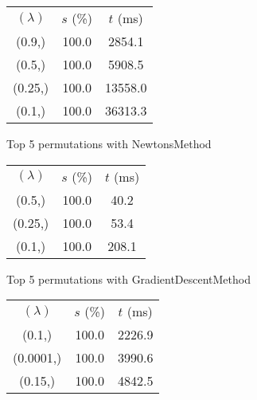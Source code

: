 \begin{figure}[H]
\label{fig:param_comp_NegativeEntropy_ConstantSearch}
\begin{subfigure}[ht]{.5\textwidth}
\begin{tabular}{|c|c|c|}
\hline
\rowcolor{gray!25}
\multicolumn{3}{|c|}{NewtonsMethod} \\
\hline
\rowcolor{gray!25}
$(\lambda)$ & $s$ (\%) & $t$ (ms) \\
\hline
(0.9,) & 100.0 & 2854.1 \\
(0.5,) & 100.0 & 5908.5 \\
(0.25,) & 100.0 & 13558.0 \\
(0.1,) & 100.0 & 36313.3 \\
\hline
\end{tabular}
\caption{Top 5 permutations with NewtonsMethod}
\label{subfig:param_comp_NegativeEntropy_NewtonsMethod_ConstantSearch}
\end{subfigure}
\hfill
\begin{subfigure}[ht]{.5\textwidth}
\begin{tabular}{|c|c|c|}
\hline
\rowcolor{gray!25}
\multicolumn{3}{|c|}{GradientDescentMethod} \\
\hline
\rowcolor{gray!25}
$(\lambda)$ & $s$ (\%) & $t$ (ms) \\
\hline
(0.5,) & 100.0 & 40.2 \\
(0.25,) & 100.0 & 53.4 \\
(0.1,) & 100.0 & 208.1 \\
\hline
\end{tabular}
\caption{Top 5 permutations with GradientDescentMethod}
\label{subfig:param_comp_NegativeEntropy_GradientDescentMethod_ConstantSearch}
\end{subfigure}
\hfill
\begin{subfigure}[ht]{.5\textwidth}
\begin{tabular}{|c|c|c|}
\hline
\rowcolor{gray!25}
\multicolumn{3}{|c|}{ConjugateGradientMethod} \\
\hline
\rowcolor{gray!25}
$(\lambda)$ & $s$ (\%) & $t$ (ms) \\
\hline
(0.1,) & 100.0 & 2226.9 \\
(0.0001,) & 100.0 & 3990.6 \\
(0.15,) & 100.0 & 4842.5 \\

\end{tabular}
\end{subfigure}
\end{figure}
